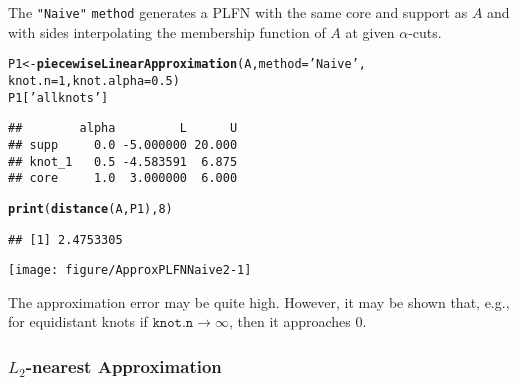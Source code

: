 \documentclass[11pt]{article}\usepackage[]{graphicx}\usepackage[]{color}
\makeatletter
\newcommand{\hlnum}[1]{\textcolor[rgb]{0.686,0.059,0.569}{#1}}%
\newcommand{\hlstr}[1]{\textcolor[rgb]{0.192,0.494,0.8}{#1}}%
\newcommand{\hlstd}[1]{\textcolor[rgb]{0.345,0.345,0.345}{#1}}%
\newcommand{\hlkwb}[1]{\textcolor[rgb]{0.69,0.353,0.396}{#1}}%
\newcommand{\hlkwc}[1]{\textcolor[rgb]{0.333,0.667,0.333}{#1}}%
\newcommand{\hlkwd}[1]{\textcolor[rgb]{0.737,0.353,0.396}{\textbf{#1}}}%
\newenvironment{kframe}{%
 \def\at@end@of@kframe{}%
 \ifinner\ifhmode%
  \def\at@end@of@kframe{\end{minipage}}%
  \begin{minipage}{\columnwidth}%
 \fi\fi%
 \def\FrameCommand##1{\hskip\@totalleftmargin \hskip-\fboxsep
 \colorbox{shadecolor}{##1}\hskip-\fboxsep
     \hskip-\linewidth \hskip-\@totalleftmargin \hskip\columnwidth}%
 \MakeFramed {\advance\hsize-\width
   \@totalleftmargin\z@ \linewidth\hsize
   \@setminipage}}%
 {\par\unskip\endMakeFramed%
 \at@end@of@kframe}
\newenvironment{knitrout}{}{} %
\newcommand{\argument}[1]{\texttt{\hlkwc{#1}}}
\newcommand{\str}[1]{\texttt{\hlstr{#1}}}
\makeatother
\begin{document}
The \str{"{}Naive"{}} \argument{method} generates a PLFN with the same
core and support as $A$ and with sides interpolating the membership function
of $A$ at given $\alpha$-cuts.

\begin{knitrout}\small
{}\color{fgcolor}\begin{kframe}
\begin{alltt}
\hlstd{P1} \hlkwb{<-} \hlkwd{piecewiseLinearApproximation}\hlstd{(A,} \hlkwc{method}\hlstd{=}\hlstr{'Naive'}\hlstd{,}
         \hlkwc{knot.n}\hlstd{=}\hlnum{1}\hlstd{,} \hlkwc{knot.alpha}\hlstd{=}\hlnum{0.5}\hlstd{)}
\hlstd{P1[}\hlstr{'allknots'}\hlstd{]}
\end{alltt}
\begin{verbatim}
##        alpha         L      U
## supp     0.0 -5.000000 20.000
## knot_1   0.5 -4.583591  6.875
## core     1.0  3.000000  6.000
\end{verbatim}
\begin{alltt}
\hlkwd{print}\hlstd{(}\hlkwd{distance}\hlstd{(A, P1),} \hlnum{8}\hlstd{)}
\end{alltt}
\begin{verbatim}
## [1] 2.4753305
\end{verbatim}
\end{kframe}
\end{knitrout}

\begin{center}
\begin{knitrout}\small
{}\color{fgcolor}

{\centering \texttt{[image: figure/ApproxPLFNNaive2-1]} 

}



\end{knitrout}
\end{center}

\noindent
The approximation error may be quite high.
However, it may be shown that, e.g., for equidistant knots if
$\mathtt{knot.n}\to\infty$,
then it approaches $0$.

\subsubsection{$L_2$-nearest Approximation}

\end{document}
